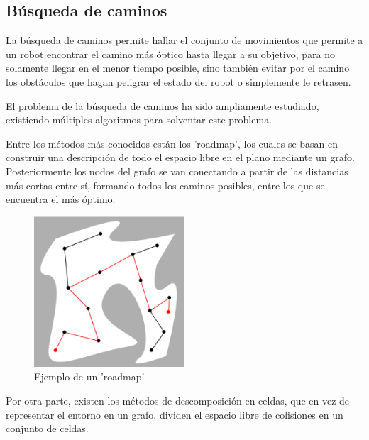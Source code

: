 \subsection{Búsqueda de caminos}
La búsqueda de caminos permite hallar el conjunto de movimientos que permite a
un robot encontrar el camino más óptico hasta llegar a su objetivo, para no
solamente llegar en el menor tiempo posible, sino también evitar por el camino
los obstáculos que hagan peligrar el estado del robot o simplemente le retrasen.

El problema de la búsqueda de caminos ha sido ampliamente estudiado, existiendo
múltiples algoritmos para solventar este problema. 

Entre los métodos más conocidos están los 'roadmap', los cuales se basan en
construir una descripción de todo el espacio libre en el plano mediante un
grafo. Posteriormente los nodos del grafo se van conectando a partir de las
distancias más cortas entre sí, formando todos los caminos posibles, entre los
que se encuentra el más óptimo.

\begin{figure}[!th]
  \begin{center}
    \includegraphics[width=0.5\textwidth]{images/cap2/BusquedaCaminosRoadmap.eps}
    \caption{Ejemplo de un 'roadmap'}
    \label{fig:BusquedaCaminosRoadmap}
  \end{center}
\end{figure}

Por otra parte, existen los métodos de descomposición en celdas, que en vez de
representar el entorno en un grafo, dividen el espacio libre de colisiones en un
conjunto de celdas. 


